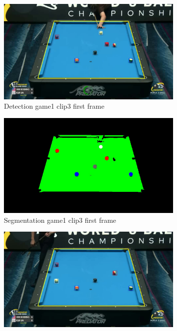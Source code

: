 \begin{figure}[H]
    \centering
    \begin{subfigure}[b]{0.48\textwidth}
        \centering
        \includegraphics[width=\textwidth]{images/Detection/game1_clip3_detected_balls_first_frame.jpg}
        \caption{Detection game1 clip3 first frame}
        \label{fig: game1_clip3_first_frame_detected}
    \end{subfigure}
    \begin{subfigure}[b]{0.48\textwidth}
        \centering
        \includegraphics[width=\textwidth]{images/Segmentation/game1_clip3_segmented_balls_first_frame.jpg}
        \caption{Segmentation game1 clip3 first frame}
		\label{fig: game1_clip3_first_frame_segmented}
    \end{subfigure}
    \begin{subfigure}[b]{0.48\textwidth}
        \centering
        \includegraphics[width=\textwidth]{images/Detection/game1_clip3_detected_balls_last_frame.jpg}

\end{subfigure}
\end{figure}

